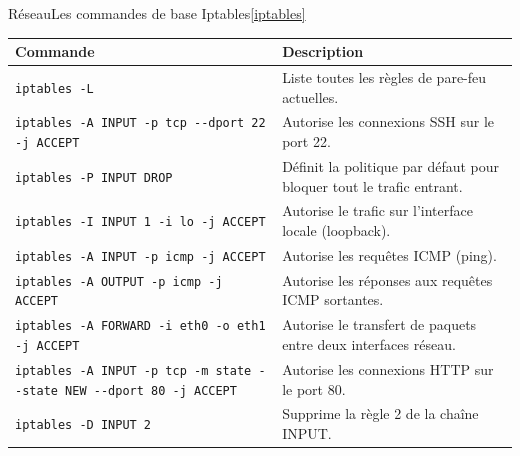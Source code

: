 \documentclass{beamer}
\begin{document}
    \begin{frame}{Réseau}{Les commandes de base Iptables\cref{iptables}}
        \begin{tiny}
            \begin{table}[ht]
                \centering
                \begin{tabular}{|p{8cm}|p{3.5cm}|}
                    \hline
                    \textbf{Commande}                                                              & \textbf{Description}                                                 \\
                    \hline
                    \lstinline{iptables -L}                                                        & Liste toutes les règles de pare-feu actuelles.                       \\
                    \hline
                    \lstinline{iptables -A INPUT -p tcp --dport 22 -j ACCEPT}                      & Autorise les connexions SSH sur le port 22.                          \\
                    \hline
                    \lstinline{iptables -P INPUT DROP}                                             & Définit la politique par défaut pour bloquer tout le trafic entrant. \\
                    \hline
                    \lstinline{iptables -I INPUT 1 -i lo -j ACCEPT}                                & Autorise le trafic sur l'interface locale (loopback).                \\
                    \hline
                    \lstinline{iptables -A INPUT -p icmp -j ACCEPT}                                & Autorise les requêtes ICMP (ping).                                   \\
                    \hline
                    \lstinline{iptables -A OUTPUT -p icmp -j ACCEPT}                               & Autorise les réponses aux requêtes ICMP sortantes.                   \\
                    \hline
                    \lstinline{iptables -A FORWARD -i eth0 -o eth1 -j ACCEPT}                      & Autorise le transfert de paquets entre deux interfaces réseau.       \\
                    \hline
                    \lstinline{iptables -A INPUT -p tcp -m state --state NEW --dport 80 -j ACCEPT} & Autorise les connexions HTTP sur le port 80.                         \\
                    \hline
                    \lstinline{iptables -D INPUT 2}                                                & Supprime la règle 2 de la chaîne INPUT.                              \\

\end{tabular}
\end{table}
\end{tiny}
\end{frame}
\end{document}
